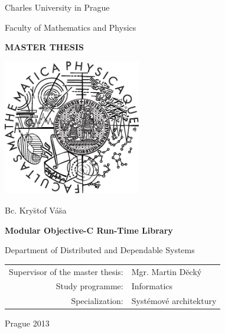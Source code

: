 \documentclass[12pt,a4paper]{report}
\begin{document}


\pagestyle{empty}
\begin{center}

\large

Charles University in Prague

\medskip

Faculty of Mathematics and Physics

\vfill

{\bf\Large MASTER THESIS}

\vfill

\centerline{\mbox{\includegraphics[width=60mm]{img/logo.eps}}}

\vfill
\vspace{5mm}

{\LARGE Bc. Kry\u{s}tof V\'{a}\u{s}a}

\vspace{15mm}

{\LARGE\bfseries Modular Objective-C Run-Time Library}

\vfill

Department of Distributed and Dependable Systems

\vfill

\begin{tabular}{rl}

Supervisor of the master thesis: & Mgr. Martin D\u{e}ck\'y \\
\noalign{\vspace{2mm}}
Study programme: & Informatics \\
\noalign{\vspace{2mm}}
Specialization: & Systémové architektury \\
\end{tabular}

\vfill

Prague 2013

\end{center}
\end{document}
